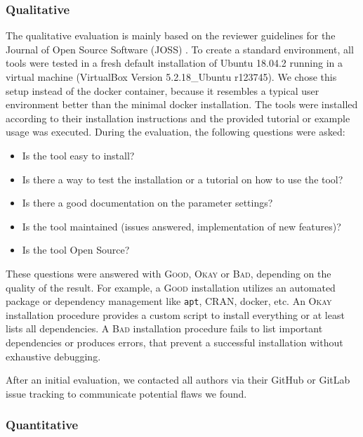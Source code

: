 \documentclass{bmcart}
\newcommand{\ok}{\textsc{Okay}}
\newcommand{\bad}{\textsc{Bad}}
\newcommand{\good}{\textsc{Good}}
\begin{document}
\subsubsection*{Qualitative}
The qualitative evaluation is mainly based on the reviewer guidelines for the Journal of Open Source Software (JOSS) \cite{joss}.
To create a standard environment, all tools were tested in a fresh default installation of Ubuntu 18.04.2 running in a virtual machine (VirtualBox Version 5.2.18\_Ubuntu r123745).
We chose this setup instead of the docker container, because it resembles a typical user environment better than the minimal docker installation.
The tools were installed according to their installation instructions and the provided tutorial or example usage was executed.
During the evaluation, the following questions were asked:

\begin{itemize}
    \item Is the tool easy to install? 
    \item Is there a way to test the installation or a tutorial on how to use the tool? 
    \item Is there a good documentation on the parameter settings? 
    \item Is the tool maintained (issues answered, implementation of new features)? 
    \item Is the tool Open Source?
\end{itemize}

These questions were answered with \good{}, \ok{} or \bad{}, depending on the quality of the result. 
For example, a \good{} installation utilizes an automated package or dependency management like \texttt{apt}, CRAN, docker, etc.
An \ok{} installation procedure provides a custom script to install everything or at least lists all dependencies.
A \bad{} installation procedure fails to list important dependencies or produces errors, that prevent a successful installation without exhaustive debugging.

After an initial evaluation, we contacted all authors via their GitHub or GitLab issue tracking to communicate potential flaws we found.

\subsubsection*{Quantitative}

%
\end{document}
